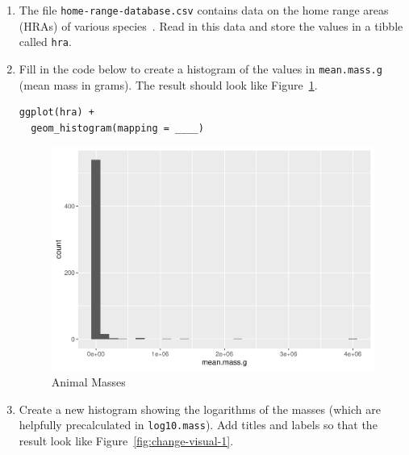 \begin{enumerate}

\item
  The file \texttt{home-range-database.csv} contains data
  on the home range areas (HRAs) of various species~\cite{Tamb2015}.
  Read in this data and store the values in a tibble called \texttt{hra}.

\item
  Fill in the code below to create a histogram of the values in \texttt{mean.mass.g}
  (mean mass in grams).
  The result should look like Figure~\ref{fig:chart-mass-1}.
  
\begin{lstlisting}
ggplot(hra) +
  geom_histogram(mapping = ____)
\end{lstlisting}

\begin{figure}[h]
  \includegraphics{figures/practice/chart-mass-1.pdf}
  \caption{Animal Masses}
  \label{fig:chart-mass-1}
\end{figure}

\item
  Create a new histogram showing the logarithms of the masses
  (which are helpfully precalculated in \texttt{log10.mass}).
  Add titles and labels so that the result look like Figure~\ref{fig:change-visual-1}.


\end{enumerate}
